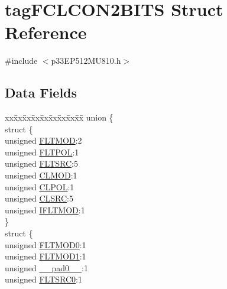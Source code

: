 \hypertarget{structtag_f_c_l_c_o_n2_b_i_t_s}{}\section{tag\+F\+C\+L\+C\+O\+N2\+B\+I\+TS Struct Reference}
\label{structtag_f_c_l_c_o_n2_b_i_t_s}


{\ttfamily \#include $<$p33\+E\+P512\+M\+U810.\+h$>$}

\subsection*{Data Fields}
\begin{DoxyCompactItemize}
\item 
\begin{tabbing}
xx\=xx\=xx\=xx\=xx\=xx\=xx\=xx\=xx\=\kill
union \{\\
\>struct \{\\
\>\>unsigned \hyperlink{structtag_f_c_l_c_o_n2_b_i_t_s_af8b7a5d667b31f1b0185c35ff963fc67}{FLTMOD}:2\\
\>\>unsigned \hyperlink{structtag_f_c_l_c_o_n2_b_i_t_s_acc9b95c2c3d735179abf0bb2304d00aa}{FLTPOL}:1\\
\>\>unsigned \hyperlink{structtag_f_c_l_c_o_n2_b_i_t_s_a5a279b9076b9774eeddf447ae606182a}{FLTSRC}:5\\
\>\>unsigned \hyperlink{structtag_f_c_l_c_o_n2_b_i_t_s_a9e490f0d4e5c9492ed27b0835fd4baa1}{CLMOD}:1\\
\>\>unsigned \hyperlink{structtag_f_c_l_c_o_n2_b_i_t_s_aa4163df728ce542fa3662a31fed0dab0}{CLPOL}:1\\
\>\>unsigned \hyperlink{structtag_f_c_l_c_o_n2_b_i_t_s_a55ab508cbc7a5023f1962f743a92a56b}{CLSRC}:5\\
\>\>unsigned \hyperlink{structtag_f_c_l_c_o_n2_b_i_t_s_a4573eed251d96a98a6b5ba1c7cc30451}{IFLTMOD}:1\\
\>\} \\
\>struct \{\\
\>\>unsigned \hyperlink{structtag_f_c_l_c_o_n2_b_i_t_s_acd6a08a1920b6cc12c170cbd6a61247d}{FLTMOD0}:1\\
\>\>unsigned \hyperlink{structtag_f_c_l_c_o_n2_b_i_t_s_accd970bed6a20d6ed7d5a8bb0a9329a3}{FLTMOD1}:1\\
\>\>unsigned \hyperlink{structtag_f_c_l_c_o_n2_b_i_t_s_adf71f3d8410c1f1dbbc96680a92c49af}{\_\_pad0\_\_}:1\\
\>\>unsigned \hyperlink{structtag_f_c_l_c_o_n2_b_i_t_s_ab130e70dc1cfc857cc586e187458c5ea}{FLTSRC0}:1\\

\end{tabbing}
\end{DoxyCompactItemize}
